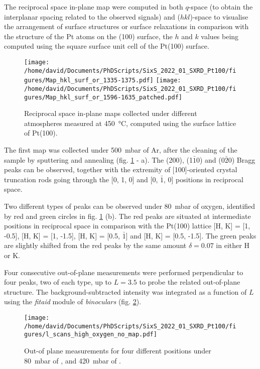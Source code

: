 The reciprocal space in-plane map were computed in both $q$-space (to obtain the interplanar spacing related to the observed signals) and ($hkl$)-space to visualise the arrangement of surface structures or surface relaxations in comparison with the structure of the Pt atoms on the (100) surface, the $h$ and $k$ values being computed using the square surface unit cell of the Pt(100) surface.

\begin{figure}[!htb]
    \centering
    \texttt{[image: /home/david/Documents/PhDScripts/SixS\_2022\_01\_SXRD\_Pt100/figures/Map\_hkl\_surf\_or\_1335-1375.pdf]}
    \texttt{[image: /home/david/Documents/PhDScripts/SixS\_2022\_01\_SXRD\_Pt100/figures/Map\_hkl\_surf\_or\_1596-1635\_patched.pdf]}
    \caption{
        Reciprocal space in-plane maps collected under different atmospheres measured at \qty{450}{\degreeCelsius}, computed using the surface lattice of Pt(100).
    }
    \label{fig:MapsPt100A}
\end{figure}

The first map was collected under \qty{500}{\milli\bar} of Ar, after the cleaning of the sample by sputtering and annealing (fig. \ref{fig:MapsPt100A} - a).
The (200), (1$\bar{1}$0) and (0$\bar{2}$0) Bragg peaks can be observed, together with the extremity of [100]-oriented crystal truncation rods going through the [0, 1, 0] and [0, $\bar{1}$, 0] positions in reciprocal space.

Two different types of peaks can be observed under \qty{80}{\milli\bar} of oxygen, identified by red and green circles in fig. \ref{fig:MapsPt100A} (b).
The red peaks are situated at intermediate positions in reciprocal space in comparison with the Pt(100) lattice [H, K] = [1, -0.5], [H, K] = [1, -1.5], [H, K] = [0.5, $\bar{1}$] and [H, K] = [0.5, -1.5].
The green peaks are slightly shifted from the red peaks by the same amount $\delta = 0.07$ in either H or K.

Four consecutive out-of-plane measurements were performed perpendicular to four peaks, two of each type, up to $L=3.5$ to probe the related out-of-plane structure.
The background-subtracted intensity was integrated as a function of $L$ using the \textit{fitaid} module of \textit{binoculars} (fig. \ref{fig:LScansHighOxygenPt100}).

\begin{figure}[!htb]
    \centering
    \texttt{[image: /home/david/Documents/PhDScripts/SixS\_2022\_01\_SXRD\_Pt100/figures/l\_scans\_high\_oxygen\_no\_map.pdf]}
    \caption{
        Out-of plane measurements for four different positions under \qty{80}{\milli\bar} of , and \qty{420}{\milli\bar} of .
    }
    \label{fig:LScansHighOxygenPt100}
\end{figure}

